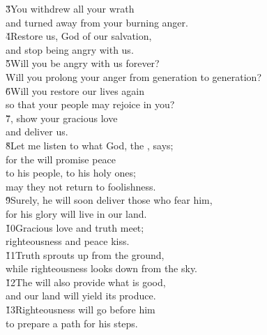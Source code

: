 \begin{poetry}
\poeml \v{3}You withdrew all your wrath \\
\poemll    and turned away from your burning anger. \\
\poeml \v{4}Restore us, God of our salvation, \\
\poemll    and stop being angry with us. \\
\poeml \v{5}Will you be angry with us forever? \\
\poemll    Will you prolong your anger from generation to generation? \\
\poeml \v{6}Will you restore our lives again \\
\poemll    so that your people may rejoice in you? \\
\poeml \v{7}, show your gracious love \\
\poemll    and deliver us. \\
\poeml \v{8}Let me listen to what God, the , says; \\
\poemll    for the  will promise peace \\
\poeml to his people, to his holy ones; \\
\poemll    may they not return to foolishness. \\
\poeml \v{9}Surely, he will soon deliver those who fear him, \\
\poemll    for his glory will live in our land. \\
\poeml \v{10}Gracious love and truth meet; \\
\poemll    righteousness and peace kiss. \\
\poeml \v{11}Truth sprouts up from the ground, \\
\poemll    while righteousness looks down from the sky. \\
\poeml \v{12}The  will also provide what is good, \\
\poemll    and our land will yield its produce. \\
\poeml \v{13}Righteousness will go before him \\
\poemll    to prepare a path for his steps.
\end{poetry}

